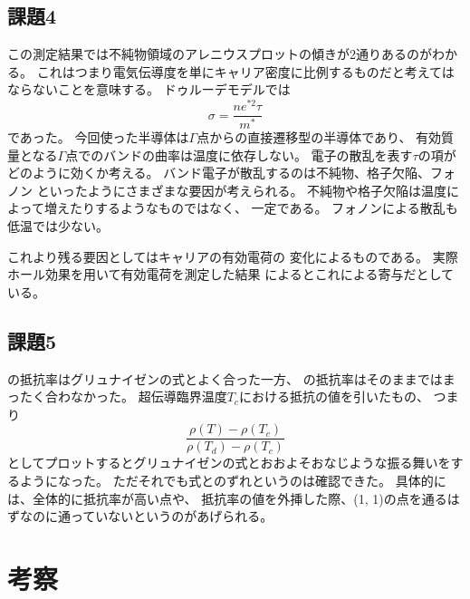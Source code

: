 \documentclass[11pt,dvipdfmx,a4paper]{jsarticle}
\begin{document}
\subsection*{課題4}
この測定結果では不純物領域のアレニウスプロットの傾きが2通りあるのがわかる。
これはつまり電気伝導度を単にキャリア密度に比例するものだと考えてはならないことを意味する。
ドゥルーデモデルでは
\begin{equation}
    \sigma = \frac{ne^{*2}\tau}{m^*}
\end{equation}
であった。
今回使った半導体は\(\Gamma\)点からの直接遷移型の半導体であり、
有効質量となる\(\Gamma\)点でのバンドの曲率は温度に依存しない。
電子の散乱を表す\(\tau\)の項がどのように効くか考える。
バンド電子が散乱するのは不純物、格子欠陥、フォノン
といったようにさまざまな要因が考えられる。
不純物や格子欠陥は温度によって増えたりするようなものではなく、
一定である。
フォノンによる散乱も低温では少ない。

これより残る要因としてはキャリアの有効電荷の
変化によるものである。
実際ホール効果を用いて有効電荷を測定した結果\cite{Hung-1950}\cite{Fritzsche-1958}
によるとこれによる寄与だとしている。

\subsection*{課題5}
 の抵抗率はグリュナイゼンの式とよく合った一方、
 の抵抗率はそのままではまったく合わなかった。
超伝導臨界温度\(T_c\)における抵抗の値を引いたもの、
つまり
\begin{equation}
    \frac{\rho(T)-\rho(T_c)}{\rho(T_d)-\rho(T_c)}
\end{equation}
としてプロットするとグリュナイゼンの式とおおよそおなじような振る舞いをするようになった。
ただそれでも式とのずれというのは確認できた。
具体的には、全体的に抵抗率が高い点や、
抵抗率の値を外挿した際、(1, 1)の点を通るはずなのに通っていないというのがあげられる。

\section{考察}
\end{document}
